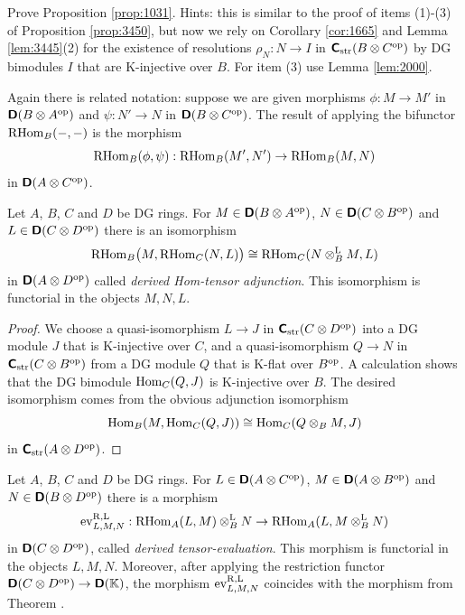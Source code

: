 \begin{exer} \label{exer:3560}
Prove Proposition \ref{prop:1031}. 
Hints: this is similar to the proof of items (1)-(3) of Proposition 
\ref{prop:3450}, but now we rely on Corollary \ref{cor:1665} and Lemma 
\ref{lem:3445}(2) for the existence of resolutions $\rho_N : N \to I$ 
in $\boldsymbol{\mathsf{C}}_{\mathrm{str}}(B \otimes C^{\mathrm{op}})$ by DG bimodules $I$
that are K-injective over $B$. For item (3) use Lemma \ref{lem:2000}.
\end{exer}

Again there is related notation: suppose we are given morphisms
$\phi : M \to M'$ in $\boldsymbol{\mathsf{D}}(B \otimes A^{\mathrm{op}})$
and $\psi : N' \to N$ in $\boldsymbol{\mathsf{D}}(B \otimes C^{\mathrm{op}})$.
The result of applying the bifunctor $\operatorname{RHom}_B(-, -)$
is the morphism
\begin{equation} \label{eqn:3476}  
\operatorname{RHom}_B(\phi, \psi) : \operatorname{RHom}_B(M', N') \to \operatorname{RHom}_B(M, N) 
\end{equation}
in $\boldsymbol{\mathsf{D}}(A \otimes C^{\mathrm{op}})$.

\begin{prop} \label{prop:3550}
Let $A$, $B$, $C$ and $D$ be DG rings. For 
$M \in \boldsymbol{\mathsf{D}}(B \otimes A^{\mathrm{op}})$,
$N \in \boldsymbol{\mathsf{D}}(C \otimes B^{\mathrm{op}})$ and 
$L \in \boldsymbol{\mathsf{D}}(C \otimes D^{\mathrm{op}})$
there is an isomorphism 
\[ \operatorname{RHom}_B \bigl( M, \operatorname{RHom}_C(N, L) \bigr) \cong 
\operatorname{RHom}_C(N \otimes_B^{\mathrm{L}} M, L) \]
in $\boldsymbol{\mathsf{D}}(A \otimes D^{\mathrm{op}})$ called {\em derived Hom-tensor adjunction}. 
This isomorphism is functorial in the objects $M, N, L$.
\end{prop}

\begin{proof}
We choose a quasi-isomorphism $L \to J$ in 
$\boldsymbol{\mathsf{C}}_{\mathrm{str}}(C \otimes D^{\mathrm{op}})$ into a DG module $J$ that is 
K-injective over $C$, and a quasi-isomorphism $Q \to N$ in 
$\boldsymbol{\mathsf{C}}_{\mathrm{str}}(C \otimes B^{\mathrm{op}})$ from a DG module $Q$ that is K-flat 
over $B^{\mathrm{op}}$. A calculation shows that the DG bimodule 
$\operatorname{Hom}_C(Q, J)$ is K-injective over $B$. 
The desired isomorphism comes from the obvious adjunction isomorphism 
\[ \operatorname{Hom}_B(M, \operatorname{Hom}_C(Q, J)) \cong 
\operatorname{Hom}_C(Q \otimes_B M, J) \]
in $\boldsymbol{\mathsf{C}}_{\mathrm{str}}(A \otimes D^{\mathrm{op}})$. 
\end{proof}

\begin{prop} \label{prop:3565}
Let $A$, $B$, $C$ and $D$ be DG rings. For 
$L \in \boldsymbol{\mathsf{D}}(A \otimes C^{\mathrm{op}})$,
$M \in \boldsymbol{\mathsf{D}}(A \otimes B^{\mathrm{op}})$ and 
$N \in \boldsymbol{\mathsf{D}}(B \otimes D^{\mathrm{op}})$
there is a morphism 
\[ \operatorname{ev}^{\mathrm{R, L}}_{L, M, N} :
\operatorname{RHom}_A(L, M) \otimes_B^{\mathrm{L}} N \to 
\operatorname{RHom}_A(L, M \otimes_B^{\mathrm{L}} N) \]
in $\boldsymbol{\mathsf{D}}(C \otimes D^{\mathrm{op}})$, called {\em derived tensor-evaluation}. 
This morphism is functorial in the objects $L, M, N$.
Moreover, after applying the restriction functor  
$\boldsymbol{\mathsf{D}}(C \otimes D^{\mathrm{op}}) \to \boldsymbol{\mathsf{D}}(\mathbb{K})$, 
the morphism $\operatorname{ev}^{\mathrm{R, L}}_{L, M, N}$ coincides with the morphism from 
Theorem \tup{\ref{thm:4320}}. 
\end{prop}

